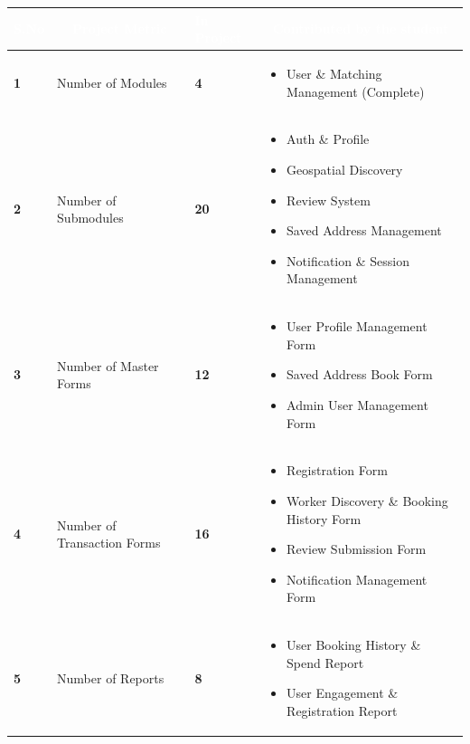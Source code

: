 \documentclass[12pt,a4paper]{article}
\begin{document}
\begin{table}[h!]
\centering
\renewcommand{\arraystretch}{1.3}
\begin{tabular}{|>{\centering\arraybackslash}p{1cm}|p{4.5cm}|>{\centering\arraybackslash}p{1.5cm}|p{7.5cm}|}
\hline
\rowcolor{headerblue}
\textcolor{white}{\textbf{S.No}} & 
\multicolumn{1}{c|}{\textcolor{white}{\textbf{Project Metric}}} & 
\textcolor{white}{\textbf{In Project}} & 
\multicolumn{1}{c|}{\textcolor{white}{\textbf{Contributed by the student}}} \\
\hline
\rowcolor{lightgray}
\textbf{1} & Number of Modules & \textbf{4} & 
\begin{itemize}[nosep, leftmargin=*, topsep=0pt]
    \item User \& Matching Management (Complete)
\end{itemize} \\
\hline

\textbf{2} & Number of Submodules & \textbf{20} & 
\begin{itemize}[nosep, leftmargin=*, topsep=0pt]
    \item Auth \& Profile
    \item Geospatial Discovery
    \item Review System
    \item Saved Address Management
    \item Notification \& Session Management
\end{itemize} \\
\hline
\rowcolor{lightgray}
\textbf{3} & Number of Master Forms & \textbf{12} & 
\begin{itemize}[nosep, leftmargin=*, topsep=0pt]
    \item User Profile Management Form
    \item Saved Address Book Form
    \item Admin User Management Form
\end{itemize} \\
\hline

\textbf{4} & Number of Transaction Forms & \textbf{16} & 
\begin{itemize}[nosep, leftmargin=*, topsep=0pt]
    \item Registration Form
    \item Worker Discovery \& Booking History Form
    \item Review Submission Form
    \item Notification Management Form
\end{itemize} \\
\hline
\rowcolor{lightgray}
\textbf{5} & Number of Reports & \textbf{8} & 
\begin{itemize}[nosep, leftmargin=*, topsep=0pt]
    \item User Booking History \& Spend Report
    \item User Engagement \& Registration Report
\end{itemize} \\
\hline


\end{tabular}
\end{table}
\end{document}
